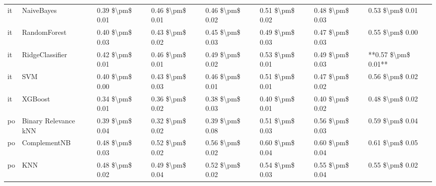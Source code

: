 \begin{tabular}{llllllll}
      it &                      NaiveBayes & 0.39 \$\textbackslash pm\$ 0.01 &           0.46 \$\textbackslash pm\$ 0.01 &       0.46 \$\textbackslash pm\$ 0.02 &        0.51 \$\textbackslash pm\$ 0.02 &                         0.48 \$\textbackslash pm\$ 0.03 &     0.53 \$\textbackslash pm\$ 0.01 \\
      it &                    RandomForest & 0.40 \$\textbackslash pm\$ 0.03 &           0.43 \$\textbackslash pm\$ 0.02 &       0.45 \$\textbackslash pm\$ 0.03 &        0.49 \$\textbackslash pm\$ 0.03 &                         0.47 \$\textbackslash pm\$ 0.03 &     0.55 \$\textbackslash pm\$ 0.00 \\
      it &                 RidgeClassifier & 0.42 \$\textbackslash pm\$ 0.01 &           0.46 \$\textbackslash pm\$ 0.01 &       0.49 \$\textbackslash pm\$ 0.02 &        0.53 \$\textbackslash pm\$ 0.01 &                         0.49 \$\textbackslash pm\$ 0.03 & **0.57 \$\textbackslash pm\$ 0.01** \\
      it &                             SVM & 0.40 \$\textbackslash pm\$ 0.00 &           0.43 \$\textbackslash pm\$ 0.03 &       0.46 \$\textbackslash pm\$ 0.01 &        0.51 \$\textbackslash pm\$ 0.01 &                         0.47 \$\textbackslash pm\$ 0.02 &     0.56 \$\textbackslash pm\$ 0.02 \\
      it &                         XGBoost & 0.34 \$\textbackslash pm\$ 0.01 &           0.36 \$\textbackslash pm\$ 0.02 &       0.38 \$\textbackslash pm\$ 0.03 &        0.40 \$\textbackslash pm\$ 0.01 &                         0.40 \$\textbackslash pm\$ 0.02 &     0.48 \$\textbackslash pm\$ 0.02 \\
      po &            Binary Relevance kNN & 0.39 \$\textbackslash pm\$ 0.04 &           0.32 \$\textbackslash pm\$ 0.02 &       0.39 \$\textbackslash pm\$ 0.08 &        0.51 \$\textbackslash pm\$ 0.03 &                         0.56 \$\textbackslash pm\$ 0.03 &     0.59 \$\textbackslash pm\$ 0.04 \\
      po &                    ComplementNB & 0.48 \$\textbackslash pm\$ 0.03 &           0.52 \$\textbackslash pm\$ 0.02 &       0.56 \$\textbackslash pm\$ 0.02 &        0.60 \$\textbackslash pm\$ 0.04 &                         0.60 \$\textbackslash pm\$ 0.04 &     0.61 \$\textbackslash pm\$ 0.05 \\
      po &                             KNN & 0.48 \$\textbackslash pm\$ 0.02 &           0.49 \$\textbackslash pm\$ 0.04 &       0.52 \$\textbackslash pm\$ 0.02 &        0.54 \$\textbackslash pm\$ 0.03 &                         0.55 \$\textbackslash pm\$ 0.04 &     0.55 \$\textbackslash pm\$ 0.02 \\

\end{tabular}
